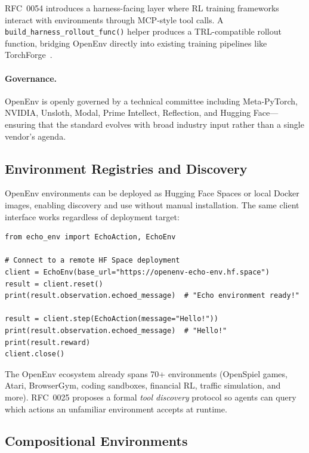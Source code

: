 RFC~0054 introduces a harness-facing layer where RL training frameworks interact with environments through MCP-style tool calls. A \texttt{build\_harness\_rollout\_func()} helper produces a TRL-compatible rollout function, bridging OpenEnv directly into existing training pipelines like TorchForge~\cite{meta2025torchforge}.

\paragraph{Governance.}
\label{governance.}

OpenEnv is openly governed by a technical committee including Meta-PyTorch, NVIDIA, Unsloth, Modal, Prime Intellect, Reflection, and Hugging Face---ensuring that the standard evolves with broad industry input rather than a single vendor’s agenda.

\subsection{Environment Registries and Discovery}
\label{environment-registries-and-discovery}

OpenEnv environments can be deployed as Hugging Face Spaces or local Docker images, enabling discovery and use without manual installation. The same client interface works regardless of deployment target:

\begin{lstlisting}[style=pythonstyle]
from echo_env import EchoAction, EchoEnv

# Connect to a remote HF Space deployment
client = EchoEnv(base_url="https://openenv-echo-env.hf.space")
result = client.reset()
print(result.observation.echoed_message)  # "Echo environment ready!"

result = client.step(EchoAction(message="Hello!"))
print(result.observation.echoed_message)  # "Hello!"
print(result.reward)
client.close()
\end{lstlisting}

The OpenEnv ecosystem already spans 70+ environments (OpenSpiel games, Atari, BrowserGym, coding sandboxes, financial RL, traffic simulation, and more). RFC~0025 proposes a formal \emph{tool discovery} protocol so agents can query which actions an unfamiliar environment accepts at runtime.

\subsection{Compositional Environments}
\label{compositional-environments}

